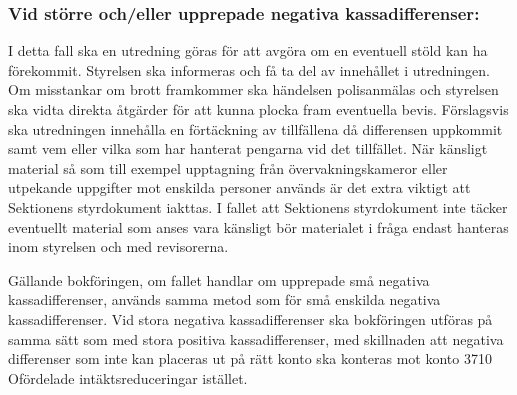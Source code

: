\documentclass[10pt]{article}
\begin{document}
\subsubsection*{Vid större och/eller upprepade negativa kassadifferenser:}
I detta fall ska en utredning göras för att avgöra om en eventuell stöld kan ha förekommit. Styrelsen ska informeras och få ta del av innehållet i utredningen.
Om misstankar om brott framkommer ska händelsen polisanmälas och styrelsen ska vidta direkta åtgärder för att kunna plocka fram eventuella bevis.
Förslagsvis ska utredningen innehålla en förtäckning av tillfällena då differensen uppkommit samt vem eller vilka som har hanterat pengarna vid det tillfället.
När känsligt material så som till exempel upptagning från övervakningskameror eller utpekande uppgifter mot enskilda personer används är det extra viktigt att Sektionens styrdokument iakttas.
I fallet att Sektionens styrdokument inte täcker eventuellt material som anses vara känsligt bör materialet i fråga endast hanteras inom styrelsen och med revisorerna.

Gällande bokföringen, om fallet handlar om upprepade små negativa kassadifferenser, används samma metod som för små enskilda negativa kassadifferenser. Vid stora negativa kassadifferenser ska bokföringen utföras på samma sätt som med stora positiva kassadifferenser, med skillnaden att negativa differenser som inte kan placeras ut på rätt konto ska konteras mot konto 3710 Ofördelade intäktsreduceringar istället.
\end{document}
